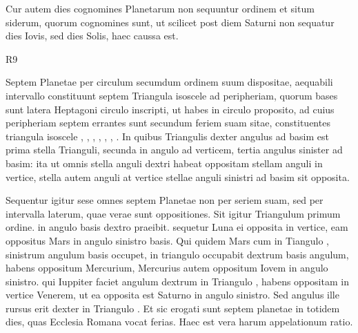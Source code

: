 

Cur autem dies cognomines Planetarum non sequuntur ordinem et
situm siderum, quorum cognomines sunt, ut scilicet post diem Saturni
non sequatur dies Iovis, sed dies Solis, haec caussa est.

\begin{wrapfigure}[9]{R}{9\baselineskip}
  \centering
  \def\svgwidth{9\baselineskip}
  {\astrofont}
\end{wrapfigure}

Septem Planetae
per circulum secumdum ordinem suum
dispositae, aequabili intervallo constituunt septem
Triangula isoscele ad peripheriam, quorum
bases sunt latera Heptagoni circulo inscripti,
ut habes in circulo proposito, ad cuius
peripheriam septem errantes sunt secundum
feriem suam sitae, constituentes triangula
isoscele , , ,
 , , , .
In quibus Triangulis dexter angulus ad basim
est prima stella Trianguli, secunda in angulo ad verticem, tertia angulus
sinister ad basim: ita ut omnis stella anguli dextri habeat oppositam
stellam anguli in vertice, stella autem anguli at vertice stellae
anguli sinistri ad basim sit opposita.

Sequentur igitur sese omnes septem
Planetae non per seriem suam, sed per intervalla laterum, quae
verae sunt oppositiones.
Sit igitur Triangulum  primum ordine.
 in angulo basis dextro praeibit. sequetur Luna ei
 opposita in vertice,
eam oppositus Mars in angulo sinistro basis.
Qui quidem Mars cum in
Tiangulo , sinistrum angulum basis occupet,
 in triangulo  occupabit
dextrum basis angulum, habens oppositum Mercurium,
Mercurius autem oppositum Iovem in angulo sinistro.
qui Iuppiter
faciet angulum dextrum in Triangulo , habens oppositam in vertice
Venerem, ut ea opposita est Saturno in angulo sinistro.
Sed angulus
ille rursus erit dexter in Triangulo .
Et sic erogati sunt septem
planetae in totidem dies, quas Ecclesia Romana vocat ferias.
Haec est vera harum appelationum ratio.

